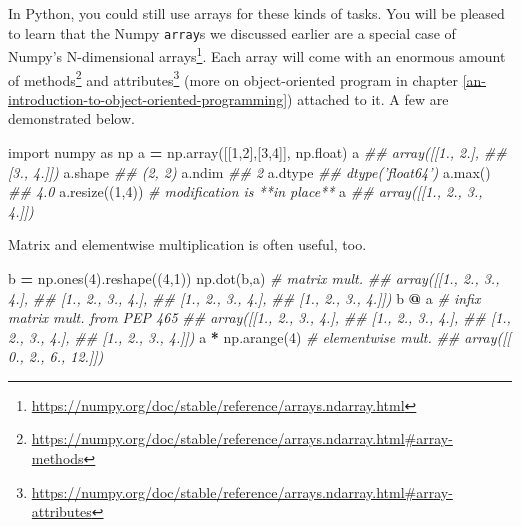 \documentclass[12pt,krantz2]{krantz}
\makeatletter
\newenvironment{Shaded}{\begin{snugshade}}{\end{snugshade}}
\newcommand{\BuiltInTok}[1]{#1}
\newcommand{\CommentTok}[1]{\textcolor[rgb]{0.37,0.37,0.37}{\textit{#1}}}
\newcommand{\DecValTok}[1]{\textcolor[rgb]{0.06,0.06,0.06}{#1}}
\newcommand{\ImportTok}[1]{#1}
\newcommand{\NormalTok}[1]{#1}
\newcommand{\OperatorTok}[1]{\textcolor[rgb]{0.43,0.43,0.43}{\textbf{#1}}}
\renewcommand{\href}[2]{#2\footnote{\url{#1}}}
\newenvironment{kframe}{%
\medskip{}
\setlength{\fboxsep}{.8em}
 \def\at@end@of@kframe{}%
 \ifinner\ifhmode%
  \def\at@end@of@kframe{\end{minipage}}%
  \begin{minipage}{\columnwidth}%
 \fi\fi%
 \def\FrameCommand##1{\hskip\@totalleftmargin \hskip-\fboxsep
 \colorbox{shadecolor}{##1}\hskip-\fboxsep
     \hskip-\linewidth \hskip-\@totalleftmargin \hskip\columnwidth}%
 \MakeFramed {\advance\hsize-\width
   \@totalleftmargin\z@ \linewidth\hsize
   \@setminipage}}%
 {\par\unskip\endMakeFramed%
 \at@end@of@kframe}
\renewenvironment{Shaded}{\begin{kframe}}{\end{kframe}}
\makeatother
\begin{document}
In Python, you could still use arrays for these kinds of tasks. You will be pleased to learn that the Numpy \texttt{array}s we discussed earlier are a special case of \href{https://numpy.org/doc/stable/reference/arrays.ndarray.html}{Numpy's N-dimensional arrays}. Each array will come with an enormous amount of \href{https://numpy.org/doc/stable/reference/arrays.ndarray.html\#array-methods}{methods} and \href{https://numpy.org/doc/stable/reference/arrays.ndarray.html\#array-attributes}{attributes} (more on object-oriented program in chapter \ref{an-introduction-to-object-oriented-programming}) attached to it. A few are demonstrated below.

\begin{Shaded}
\begin{Highlighting}[]
\ImportTok{import}\NormalTok{ numpy }\ImportTok{as}\NormalTok{ np}
\NormalTok{a }\OperatorTok{=}\NormalTok{ np.array([[}\DecValTok{1}\NormalTok{,}\DecValTok{2}\NormalTok{],[}\DecValTok{3}\NormalTok{,}\DecValTok{4}\NormalTok{]], np.}\BuiltInTok{float}\NormalTok{)}
\NormalTok{a}
\CommentTok{## array([[1., 2.],}
\CommentTok{##        [3., 4.]])}
\NormalTok{a.shape}
\CommentTok{## (2, 2)}
\NormalTok{a.ndim}
\CommentTok{## 2}
\NormalTok{a.dtype}
\CommentTok{## dtype('float64')}
\NormalTok{a.}\BuiltInTok{max}\NormalTok{()}
\CommentTok{## 4.0}
\NormalTok{a.resize((}\DecValTok{1}\NormalTok{,}\DecValTok{4}\NormalTok{)) }\CommentTok{# modification is **in place**}
\NormalTok{a}
\CommentTok{## array([[1., 2., 3., 4.]])}
\end{Highlighting}
\end{Shaded}

Matrix and elementwise multiplication is often useful, too.

\begin{Shaded}
\begin{Highlighting}[]
\NormalTok{b }\OperatorTok{=}\NormalTok{ np.ones(}\DecValTok{4}\NormalTok{).reshape((}\DecValTok{4}\NormalTok{,}\DecValTok{1}\NormalTok{)) }
\NormalTok{np.dot(b,a) }\CommentTok{# matrix mult.}
\CommentTok{## array([[1., 2., 3., 4.],}
\CommentTok{##        [1., 2., 3., 4.],}
\CommentTok{##        [1., 2., 3., 4.],}
\CommentTok{##        [1., 2., 3., 4.]])}
\NormalTok{b }\OperatorTok{@}\NormalTok{ a }\CommentTok{# infix matrix mult. from PEP 465}
\CommentTok{## array([[1., 2., 3., 4.],}
\CommentTok{##        [1., 2., 3., 4.],}
\CommentTok{##        [1., 2., 3., 4.],}
\CommentTok{##        [1., 2., 3., 4.]])}
\NormalTok{a }\OperatorTok{*}\NormalTok{ np.arange(}\DecValTok{4}\NormalTok{) }\CommentTok{# elementwise mult.}
\CommentTok{## array([[ 0.,  2.,  6., 12.]])}
\end{Highlighting}
\end{Shaded}
\end{document}
